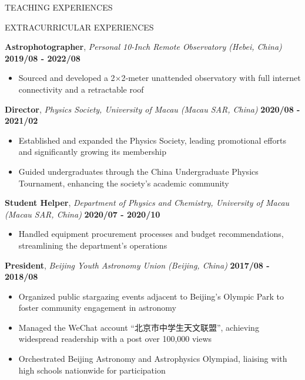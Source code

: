 \documentclass[10pt]{article} %
\begin{document}
\begin{section}{TEACHING EXPERIENCES}
\end{section}

\begin{section}{EXTRACURRICULAR EXPERIENCES}
    
\textbf{Astrophotographer}, \textit{Personal 10-Inch Remote Observatory (Hebei, China)} \hfill \textbf{2019/08 - 2022/08}
\begin{itemize}[leftmargin=1.5em]
    \item Sourced and developed a 2$\times$2‑meter unattended observatory with full internet connectivity and a retractable roof
\end{itemize}

\textbf{Director}, \textit{Physics Society, University of Macau (Macau SAR, China)} \hfill \textbf{2020/08 - 2021/02} 
\begin{itemize}[leftmargin=1.5em]
    \item Established and expanded the Physics Society, leading promotional efforts and significantly growing its membership
    \item Guided undergraduates through the China Undergraduate Physics Tournament, enhancing the society's academic community
\end{itemize}

\textbf{Student Helper}, \textit{Department of Physics and Chemistry, University of Macau (Macau SAR, China)} \hfill \textbf{2020/07 - 2020/10} 
\begin{itemize}[leftmargin=1.5em]
    \item Handled equipment procurement processes and budget recommendations, streamlining the department's operations
\end{itemize}

\textbf{President}, \textit{Beijing Youth Astronomy Union (Beijing, China)} \hfill \textbf{2017/08 - 2018/08} 
\begin{itemize}[leftmargin=1.5em]
    \item Organized public stargazing events adjacent to Beijing's Olympic Park to foster community engagement in astronomy
    \item Managed the WeChat account ``北京市中学生天文联盟'', achieving widespread readership with a post over 100,000 views
    \item Orchestrated Beijing Astronomy and Astrophysics Olympiad, liaising with high schools nationwide for participation
\end{itemize}


\end{section}
\end{document}

